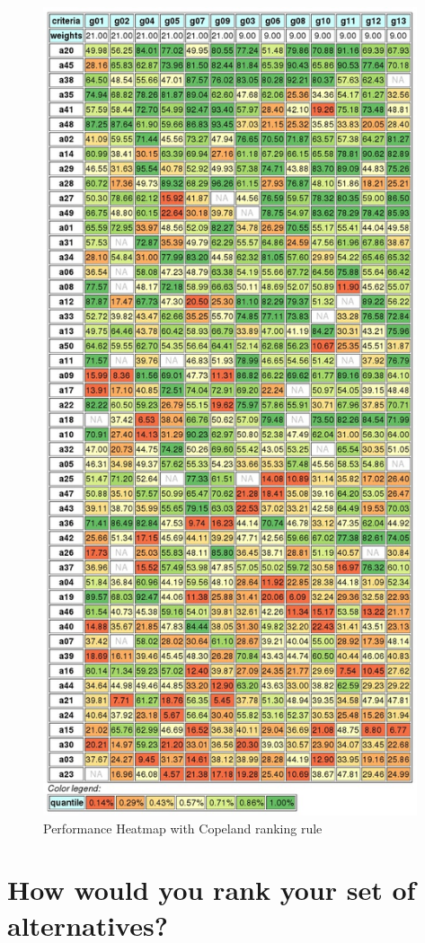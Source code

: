 \documentclass[a4paper]{article}
\begin{document}
\begin{figure}
	\centering
	\includegraphics[width=11cm]{figures/full_heatmap}
	\caption{Performance Heatmap with Copeland ranking rule}
	\label{fig:heatmap}
\end{figure}


\section{How would you rank your set of alternatives?}
\end{document}
